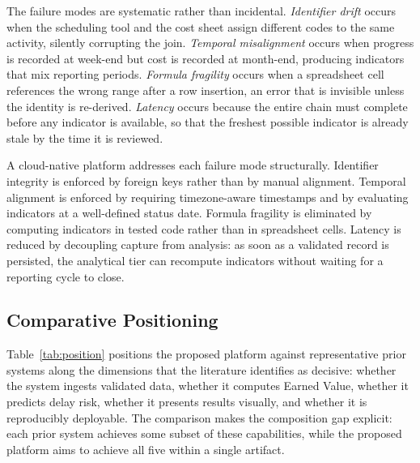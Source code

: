 \documentclass[conference]{IEEEtran}
\begin{document}
The failure modes are systematic rather than incidental. \emph{Identifier drift} occurs when the scheduling tool and the cost sheet assign different codes to the same activity, silently corrupting the join. \emph{Temporal misalignment} occurs when progress is recorded at week-end but cost is recorded at month-end, producing indicators that mix reporting periods. \emph{Formula fragility} occurs when a spreadsheet cell references the wrong range after a row insertion, an error that is invisible unless the identity is re-derived. \emph{Latency} occurs because the entire chain must complete before any indicator is available, so that the freshest possible indicator is already stale by the time it is reviewed.

A cloud-native platform addresses each failure mode structurally. Identifier integrity is enforced by foreign keys rather than by manual alignment. Temporal alignment is enforced by requiring timezone-aware timestamps and by evaluating indicators at a well-defined status date. Formula fragility is eliminated by computing indicators in tested code rather than in spreadsheet cells. Latency is reduced by decoupling capture from analysis: as soon as a validated record is persisted, the analytical tier can recompute indicators without waiting for a reporting cycle to close.

\subsection{Comparative Positioning}

Table~\ref{tab:position} positions the proposed platform against representative prior systems along the dimensions that the literature identifies as decisive: whether the system ingests validated data, whether it computes Earned Value, whether it predicts delay risk, whether it presents results visually, and whether it is reproducibly deployable. The comparison makes the composition gap explicit: each prior system achieves some subset of these capabilities, while the proposed platform aims to achieve all five within a single artifact.
\end{document}
